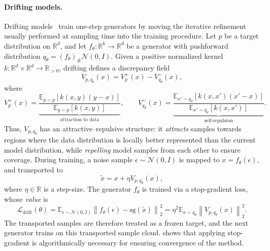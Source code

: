 \documentclass{article}
\theoremstyle{plain}
\begin{document}
\paragraph{Drifting models.} Drifting models~\cite{Deng_2026_Drift} train one-step generators by moving the iterative refinement usually performed at sampling time into the training procedure. Let \(p\) be a target distribution on \(\mathbb{R}^d\), and let
\(f_\theta : \mathbb{R}^k \to \mathbb{R}^d\) be a generator with pushforward distribution
\(q_\theta = (f_\theta)_{\#}\mathcal{N}(0,I)\). Given a positive normalized kernel
\(k : \mathbb{R}^d \times \mathbb{R}^d \to \mathbb{R}_{>0}\), drifting defines a discrepancy field
\[
V_{p,q_\theta}(x) = V_p^{+}(x) - V_{q_\theta}^{-}(x),
\]
where
\begin{equation}\label{eq:drifting_field}
V_p^{+}(x)
=
\underbrace{\frac{\mathbb{E}_{y \sim p}\!\left[k(x,y)(y-x)\right]}
     {\mathbb{E}_{y \sim p}\!\left[k(x,y)\right]}}_{\text{attraction to data}},
\qquad
V_{q_\theta}^{-}(x)
=
\underbrace{\frac{\mathbb{E}_{x' \sim q_\theta}\!\left[k(x,x')(x'-x)\right]}
     {\mathbb{E}_{x' \sim q_\theta}\!\left[k(x,x')\right]}}_{\text{self-repulsion}}.
\end{equation}
Thus, \(V_{p,q_\theta}\) has an attractive--repulsive structure: it \textit{attracts} samples towards regions where the data distribution is locally better represented than the current model distribution, while \textit{repelling} model samples from each other to ensure coverage. During training, a noise sample \(\epsilon \sim \mathcal{N}(0,I)\) is mapped to
\(x = f_\theta(\epsilon)\), and transported to
\begin{equation}\label{eq:displacement}
\widetilde{x}
=
x + \eta V_{p,q_\theta}(x),
\end{equation}
where $\eta \in \mathbb{R}$ is a step-size. The generator \(f_\theta\) is trained via a stop-gradient loss, whose \textit{value} is
\begin{equation}
\label{eq:drifting_loss}
\mathcal{L}_{\mathrm{drift}}(\theta)
=
\mathbb{E}_{\epsilon \sim \mathcal{N}(0,I)}
\left\|
f_\theta(\epsilon)
-
\mathrm{sg}\!\left(\widetilde{x}\right)
\right\|_2^2=\eta^2
\mathbb{E}_{x \sim q_\theta}
\left\|
V_{p,q_\theta}(x)
\right\|_2^2.
\end{equation}
The transported samples are therefore treated as a frozen target, and the next generator trains on this transported sample cloud. \citep{Turan_2026_Drifting} shows that applying stop-gradient is algorithmically necessary for ensuring convergence of the method.
\end{document}
